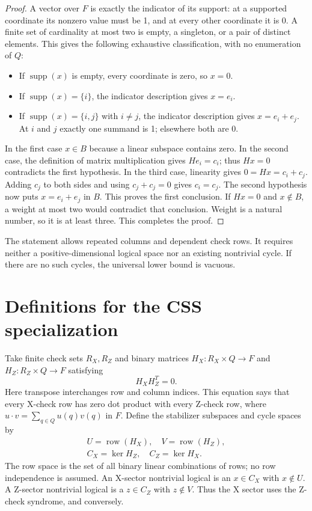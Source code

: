 \documentclass{article}
\DeclareMathOperator{\supp}{supp}
\DeclareMathOperator{\row}{row}
\begin{document}
\begin{proof}
  A vector over \(F\) is exactly the indicator of its support: at a supported coordinate
  its nonzero value must be 1, and at every other coordinate it is 0. A finite set of
  cardinality at most two is empty, a singleton, or a pair of distinct elements. This
  gives the following exhaustive classification, with no enumeration of \(Q\):
  \begin{itemize}
    \item If \(\supp(x)\) is empty, every coordinate is zero, so \(x = 0\).
    \item If \(\supp(x) = \{i\}\), the indicator description gives \(x = e_i\).
    \item If \(\supp(x) = \{i, j\}\) with \(i \ne j\), the indicator description gives
      \(x = e_i + e_j\). At \(i\) and \(j\) exactly one summand is 1; elsewhere both are 0.
  \end{itemize}
  In the first case \(x \in B\) because a linear subspace contains zero. In the second
  case, the definition of matrix multiplication gives \(He_i = c_i\); thus \(Hx = 0\)
  contradicts the first hypothesis. In the third case, linearity gives
  \(0 = Hx = c_i + c_j\). Adding \(c_j\) to both sides and using \(c_j + c_j = 0\) gives
  \(c_i = c_j\). The second hypothesis now puts \(x = e_i + e_j\) in \(B\). This proves the
  first conclusion. If \(Hx = 0\) and \(x \notin B\), a weight at most two would contradict
  that conclusion. Weight is a natural number, so it is at least three. This completes the
  proof.
\end{proof}

The statement allows repeated columns and dependent check rows. It requires neither a
positive-dimensional logical space nor an existing nontrivial cycle. If there are no such
cycles, the universal lower bound is vacuous.

\section{Definitions for the CSS specialization}\label{sec:css-definitions}

Take finite check sets \(R_X, R_Z\) and binary matrices \(H_X \colon R_X \times Q \to F\)
and \(H_Z \colon R_Z \times Q \to F\) satisfying
\begin{equation}
  H_X H_Z^T = 0.
\end{equation}
Here transpose interchanges row and column indices. This equation says that every X-check
row has zero dot product with every Z-check row, where
\(u \cdot v = \sum_{q \in Q} u(q) v(q)\) in \(F\). Define the stabilizer subspaces and
cycle spaces by
\begin{gather}
  U = \row(H_X), \quad V = \row(H_Z), \\
  C_X = \ker H_Z, \quad C_Z = \ker H_X.
\end{gather}
The row space is the set of all binary linear combinations of rows; no row independence is
assumed. An X-sector nontrivial logical is an \(x \in C_X\) with \(x \notin U\). A Z-sector
nontrivial logical is a \(z \in C_Z\) with \(z \notin V\). Thus the X sector uses the
Z-check syndrome, and conversely.
\end{document}

